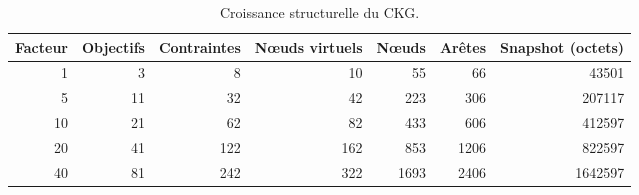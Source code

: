 \begin{table}[!t]
\centering
\caption{Croissance structurelle du CKG.}
\label{tab:scalability-structural}
\scriptsize
\setlength{\tabcolsep}{5pt}
\begin{tabular}{rrrrrrr}
\toprule
Facteur & Objectifs & Contraintes & Nœuds virtuels & Nœuds & Arêtes & Snapshot (octets) \\
\midrule
1 & 3 & 8 & 10 & 55 & 66 & 43501 \\
5 & 11 & 32 & 42 & 223 & 306 & 207117 \\
10 & 21 & 62 & 82 & 433 & 606 & 412597 \\
20 & 41 & 122 & 162 & 853 & 1206 & 822597 \\
40 & 81 & 242 & 322 & 1693 & 2406 & 1642597 \\
\bottomrule
\end{tabular}
\end{table}
